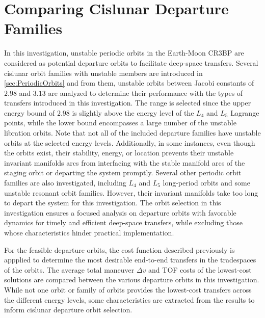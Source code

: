 \section{Comparing Cislunar Departure Families}\label{sec:ComparingDeparture}
In this investigation, unstable periodic orbits in the Earth-Moon CR3BP are considered as potential
departure orbits to facilitate deep-space transfers. Several cislunar orbit families with unstable
members are introduced in \cref{sec:PeriodicOrbits} and from them, unstable orbits between Jacobi
constants of $2.98$ and $3.13$ are analyzed to determine their performance with the types of
transfers introduced in this investigation. The range is selected since the upper energy bound of
$2.98$ is slightly above the energy level of the $L_{4}$ and $L_{5}$ Lagrange points, while the
lower bound encompasses a large number of the unstable libration orbits\cite{Zimovan:2017}. Note
that not all of the included departure families have unstable orbits at the selected energy levels.
Additionally, in some instances, even though the orbits exist, their stability, energy, or location
prevents their unstable invariant manifolds arcs from interfacing with the stable manifold arcs of
the staging orbit or departing the system promptly. Several other periodic orbit families are also
investigated, including $L_{4}$ and $L_{5}$ long-period orbits and some unstable resonant orbit
families. However, their invariant manifolds take too long to depart the system for this
investigation. The orbit selection in this investigation ensures a focused analysis on departure
orbits with favorable dynamics for timely and efficient deep-space transfers, while excluding those
whose characteristics hinder practical implementation.

For the feasible departure orbits, the cost function described previously is appplied to determine
the most desirable end-to-end transfers in the tradespaces of the orbits. The average total
maneuver $\Delta v$ and TOF costs of the lowest-cost solutions are compared between the various
departure orbits in this investigation. While not one orbit or family of orbits provides the
lowest-cost transfers across the different energy levels, some characteristics are extracted from
the results to inform cislunar departure orbit selection.

